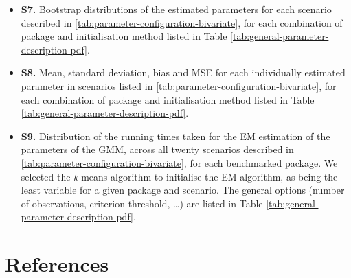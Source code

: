\begin{itemize}
  \begin{itemize}
  \item
    \textbf{S7.} Bootstrap distributions of the estimated parameters for each
    scenario described in \ref{tab:parameter-configuration-bivariate}, for each
    combination of package and initialisation method listed in Table \ref{tab:general-parameter-description-pdf}.
  \item
    \textbf{S8.} Mean, standard deviation, bias and MSE for each individually
    estimated parameter in scenarios listed in \ref{tab:parameter-configuration-bivariate}, for each
    combination of package and initialisation method listed in Table \ref{tab:general-parameter-description-pdf}.
  \item
    \textbf{S9.} Distribution of the running times taken for the EM estimation of the parameters of the GMM, across all twenty scenarios described in \ref{tab:parameter-configuration-bivariate}, for each benchmarked package. We selected the \emph{k}-means algorithm to initialise the EM algorithm, as being the least variable for a given package and scenario. The general options (number of observations, criterion threshold, \ldots) are listed in Table \ref{tab:general-parameter-description-pdf}.
  \end{itemize}
\end{itemize}

\hypertarget{references}{%
\section{References}\label{references}}



\address{%
Bastien Chassagnol\\
Laboratoire de Probabilités, Statistiques et Modélisation (LPSM), UMR CNRS 8001\\%
4 Place Jussieu Sorbonne Université\\ 75005, Paris, France\\
%
%
\textit{ORCiD: \href{https://orcid.org/0000-0002-8955-2391}{0000-0002-8955-2391}}\\%
\href{mailto:bastien_chassagnol@laposte.net}{\nolinkurl{bastien\_chassagnol@laposte.net}}%
}

\address{%
Antoine Bichat\\
Les Laboratoires Servier\\%
50 Rue Carnot\\ 92150, Suresnes, France\\
%
\url{https://rdrr.io/github/abichat/abutils/}\\%
\textit{ORCiD: \href{https://orcid.org/0000-0001-6599-7081}{0000-0001-6599-7081}}\\%
\href{mailto:antoine.bichat@servier.com}{\nolinkurl{antoine.bichat@servier.com}}%
}

